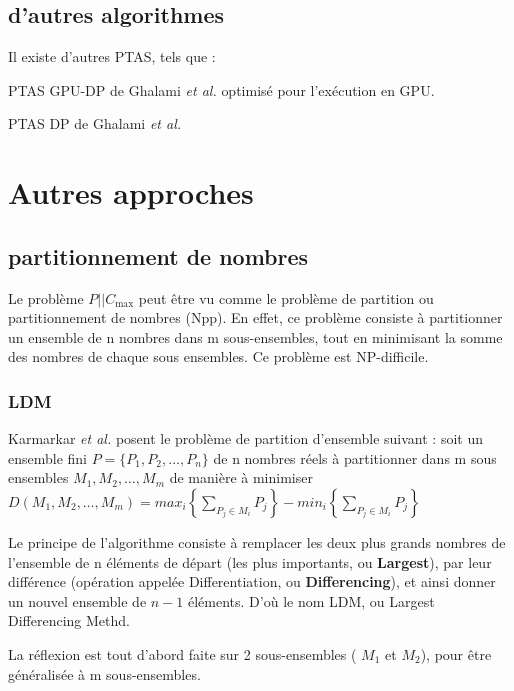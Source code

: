 \documentclass[a4paper,12pt]{report}
\theoremstyle{plain}				%
\theoremstyle{definition}				%
\newcommand\problemGrahamP{$P||C_{\max}$\xspace}
\begin{document}
\subsection{d'autres algorithmes}
Il existe d'autres PTAS, tels que :

PTAS GPU-DP de Ghalami \emph{et al.} \cite{li2018gpu} optimisé pour l'exécution en GPU.

PTAS DP de Ghalami \emph{et al.} \cite{ghalami2019scheduling}


\section{Autres approches}

\subsection{partitionnement de nombres}
Le problème \problemGrahamP peut être vu comme le problème de partition ou partitionnement de nombres (Npp).
En effet, ce problème consiste à partitionner un ensemble de n nombres dans m sous-ensembles,
tout en minimisant la somme des nombres de chaque sous ensembles.
Ce problème est NP-difficile.

\subsubsection{LDM}


Karmarkar \emph{et al.} \cite{karmarkar1982differencing} posent le problème de partition d'ensemble suivant :
soit un ensemble fini $P=\{P_1, P_2, \ldots, P_n\}$ de
n nombres réels
à partitionner dans m sous ensembles $M_1, M_2, \ldots, M_m$
de manière à minimiser
$D(M_1, M_2, \ldots, M_m) = max_i \left\{ \sum_{P_j \in M_i}P_j \right\} - min_i \left\{ \sum_{P_j \in M_i}P_j \right\}$

Le principe de l'algorithme consiste à remplacer les deux plus grands nombres de l'ensemble de n éléments de départ
(les plus importants, ou \textbf{Largest}),
par leur différence
(opération appelée Differentiation, ou \textbf{Differencing}),
et ainsi donner un nouvel ensemble de $n-1$ éléments.
D'où le nom LDM, ou Largest Differencing Methd.


La réflexion est tout d'abord faite sur 2 sous-ensembles ( $M_1$ et $M_2$), pour être généralisée à m sous-ensembles.
\end{document}
